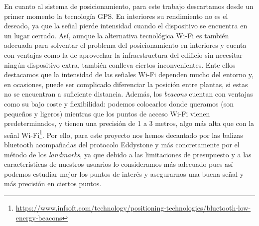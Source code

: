 En cuanto al sistema de posicionamiento, para este trabajo descartamos desde un primer momento la tecnología GPS. En interiores su rendimiento no es el deseado, ya que la señal pierde intensidad cuando el dispositivo se encuentra en un lugar cerrado. Así, aunque la alternativa tecnológica Wi-Fi es también adecuada para solventar el problema del posicionamiento en interiores y cuenta con ventajas como la de aprovechar la infraestructura del edificio sin necesitar ningún dispositivo extra, también conlleva ciertos inconvenientes. Ente ellos destacamos que la intensidad de las señales Wi-Fi dependen mucho del entorno y, en ocasiones, puede ser complicado diferenciar la posición entre plantas, si estas no se encuentran a suficiente distancia. Además, los \textit{beacons} cuentan con ventajas como su bajo coste y flexibilidad: podemos colocarlos donde queramos (son pequeños y ligeros) mientras que los puntos de acceso Wi-Fi vienen predeterminados, y tienen una precisión de 1 a 3 metros, algo más alta que con la señal Wi-Fi\footnote{\url{https://www.infsoft.com/technology/positioning-technologies/bluetooth-low-energy-beacons}}. Por ello, para este proyecto nos hemos decantado por las balizas bluetooth acompañadas del protocolo Eddystone y más concretamente por el método de los \textit{landmarks}, ya que debido a las limitaciones de presupuesto y a las características de nuestros usuarios lo consideramos más adecuado pues así podemos estudiar mejor los puntos de interés y asegurarnos una buena señal y más precisión en ciertos puntos.






 